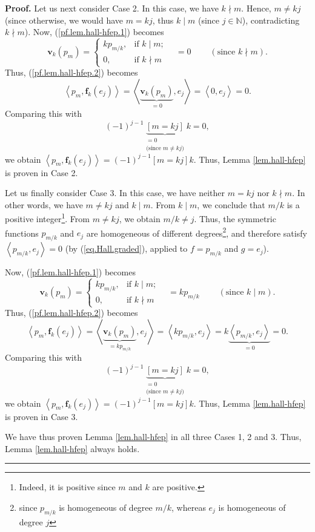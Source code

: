 \documentclass[numbers=enddot,12pt,final,onecolumn,notitlepage]{scrartcl}%
\theoremstyle{definition}
\newenvironment{proof}[1][Proof]{\noindent\textbf{#1.} }{\ \rule{0.5em}{0.5em}}
\newenvironment{verlong}{}{}
\begin{document}
\begin{proof}
\begin{verlong}
Let us next consider Case 2. In this case, we have $k\nmid m$. Hence, $m\neq
kj$ (since otherwise, we would have $m=kj$, thus $k\mid m$ (since
$j\in\mathbb{N}$), contradicting $k\nmid m$). Now, (\ref{pf.lem.hall-hfep.1})
becomes%
\[
\mathbf{v}_{k}\left(  p_{m}\right)  =%
\begin{cases}
kp_{m/k}, & \text{if }k\mid m;\\
0, & \text{if }k\nmid m
\end{cases}
\ \ \ \ =0\ \ \ \ \ \ \ \ \ \ \left(  \text{since }k\nmid m\right)  .
\]
Thus, (\ref{pf.lem.hall-hfep.2}) becomes%
\[
\left\langle p_{m},\mathbf{f}_{k}\left(  e_{j}\right)  \right\rangle
=\left\langle \underbrace{\mathbf{v}_{k}\left(  p_{m}\right)  }_{=0}%
,e_{j}\right\rangle =\left\langle 0,e_{j}\right\rangle =0.
\]
Comparing this with%
\[
\left(  -1\right)  ^{j-1}\underbrace{\left[  m=kj\right]  }%
_{\substack{=0\\\text{(since }m\neq kj\text{)}}}k=0,
\]
we obtain $\left\langle p_{m},\mathbf{f}_{k}\left(  e_{j}\right)
\right\rangle =\left(  -1\right)  ^{j-1}\left[  m=kj\right]  k$. Thus, Lemma
\ref{lem.hall-hfep} is proven in Case 2.
\end{verlong}

Let us finally consider Case 3. In this case, we have neither $m=kj$ nor
$k\nmid m$. In other words, we have $m\neq kj$ and $k\mid m$. From $k\mid m$,
we conclude that $m/k$ is a positive integer\footnote{Indeed, it is positive
since $m$ and $k$ are positive.}. From $m\neq kj$, we obtain $m/k\neq j$.
Thus, the symmetric functions $p_{m/k}$ and $e_{j}$ are homogeneous of
different degrees\footnote{since $p_{m/k}$ is homogeneous of degree $m/k$,
whereas $e_{j}$ is homogeneous of degree $j$}, and therefore satisfy
$\left\langle p_{m/k},e_{j}\right\rangle =0$ (by (\ref{eq.Hall.graded}),
applied to $f=p_{m/k}$ and $g=e_{j}$).

Now, (\ref{pf.lem.hall-hfep.1}) becomes%
\[
\mathbf{v}_{k}\left(  p_{m}\right)  =%
\begin{cases}
kp_{m/k}, & \text{if }k\mid m;\\
0, & \text{if }k\nmid m
\end{cases}
\ \ \ \ =kp_{m/k}\ \ \ \ \ \ \ \ \ \ \left(  \text{since }k\mid m\right)  .
\]
Thus, (\ref{pf.lem.hall-hfep.2}) becomes%
\[
\left\langle p_{m},\mathbf{f}_{k}\left(  e_{j}\right)  \right\rangle
=\left\langle \underbrace{\mathbf{v}_{k}\left(  p_{m}\right)  }_{=kp_{m/k}%
},e_{j}\right\rangle =\left\langle kp_{m/k},e_{j}\right\rangle
=k\underbrace{\left\langle p_{m/k},e_{j}\right\rangle }_{=0}=0.
\]
Comparing this with%
\[
\left(  -1\right)  ^{j-1}\underbrace{\left[  m=kj\right]  }%
_{\substack{=0\\\text{(since }m\neq kj\text{)}}}k=0,
\]
we obtain $\left\langle p_{m},\mathbf{f}_{k}\left(  e_{j}\right)
\right\rangle =\left(  -1\right)  ^{j-1}\left[  m=kj\right]  k$. Thus, Lemma
\ref{lem.hall-hfep} is proven in Case 3.

We have thus proven Lemma \ref{lem.hall-hfep} in all three Cases 1, 2 and 3.
Thus, Lemma \ref{lem.hall-hfep} always holds.
\end{proof}
\end{document}
